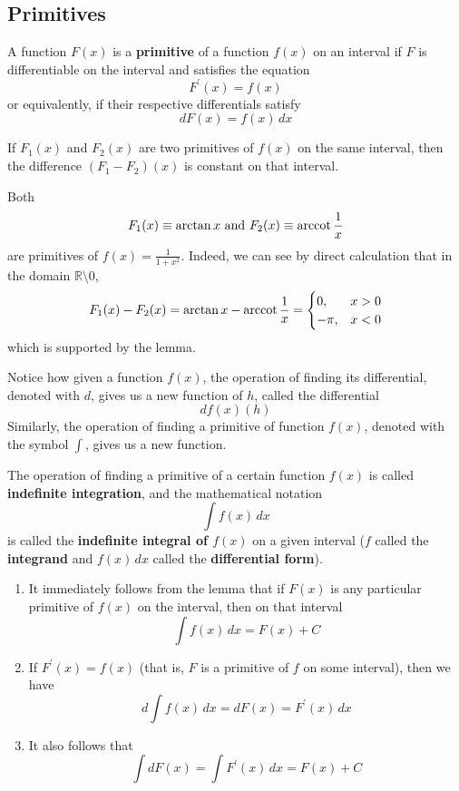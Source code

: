    \subsection{Primitives}

      \begin{definition}[Primitive]
        A function $F(x)$ is a \textbf{primitive} of a function $f(x)$ on an interval if $F$ is differentiable on the interval and satisfies the equation 
        \[F^\prime (x) = f(x)\]
        or equivalently, if their respective differentials satisfy
        \[d F(x) = f(x) \,dx\]
      \end{definition}

      \begin{lemma}
        If $F_1(x)$ and $F_2 (x)$ are two primitives of $f(x)$ on the same interval, then the difference $(F_1 - F_2)(x)$ is constant on that interval. 
      \end{lemma}

    \begin{example}
    Both 
    \[F_1(x) \equiv \arctan{x} \text{ and } F_2(x) \equiv \operatorname{arccot}{\frac{1}{x}}\]
    are primitives of $f(x) = \frac{1}{1 + x^2}$. Indeed, we can see by direct calculation that in the domain $\mathbb{R} \setminus 0$, 
    \[F_1 (x) - F_2 (x) = \arctan{x} - \operatorname{arccot}{\frac{1}{x}} = \begin{cases}
    0, & x > 0 \\
    -\pi, & x < 0
    \end{cases}\]
    which is supported by the lemma. 
    \end{example}

      Notice how given a function $f(x)$, the operation of finding its differential, denoted with $d$, gives us a new function of $h$, called the differential 
      \[df(x)(h)\]
      Similarly, the operation of finding a primitive of function $f(x)$, denoted with the symbol $\int$, gives us a new function. 

      \begin{definition}
        The operation of finding a primitive of a certain function $f(x)$ is called \textbf{indefinite integration}, and the mathematical notation 
        \[\int f(x) \,dx\]
        is called the \textbf{indefinite integral of $f(x)$} on a given interval ($f$ called the \textbf{integrand} and $f(x)\,dx$ called the \textbf{differential form}). 
        \begin{enumerate}
          \item It immediately follows from the lemma that if $F(x)$ is any particular primitive of $f(x)$ on the interval, then on that interval 
          \[\int f(x) \,dx = F(x) + C\]
          \item If $F^\prime (x) = f(x)$ (that is, $F$ is a primitive of $f$ on some interval), then we have
          \[d \int f(x)\,dx = d F(x) = F^\prime (x) \,dx \]
          \item It also follows that 
          \[\int d F(x) = \int F^\prime (x)\,dx = F(x) + C\]
        \end{enumerate}
      \end{definition}

